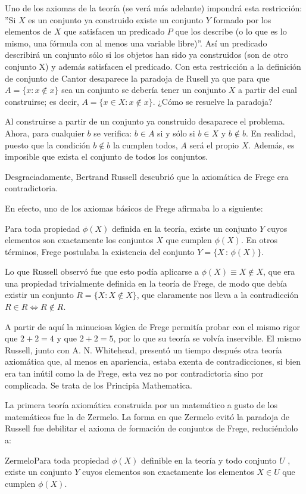 Uno de los axiomas de la teoría (se verá más adelante) impondrá esta
restricción: ”Si $X$ es un conjunto ya construido existe un conjunto
$Y$ formado por los elementos de $X$ que satisfacen un predicado
$P$ que los describe (o lo que es lo mismo, una fórmula con al menos
una variable libre)”. Así un predicado describirá un conjunto sólo
si los objetos han sido ya construidos (son de otro conjunto X) y
además satisfacen el predicado. Con esta restricción a la definición
de conjunto de Cantor desaparece la paradoja de Rusell ya que para
que $A=\{x:x\notin x\}$ sea un conjunto se debería tener un conjunto
$X$ a partir del cual construirse; es decir, $A=\{x\in X:x\notin x\}$.
¿Cómo se resuelve la paradoja? 

Al construirse a partir de un conjunto ya construido desaparece el
problema. Ahora, para cualquier $b$ se verifica: $b\in A$ si y sólo
si $b\in X$ y $b\notin b$. En realidad, puesto que la condición
$b\notin b$ la cumplen todos, $A$ será el propio $X$. Además, es
imposible que exista el conjunto de todos los conjuntos. 

Desgraciadamente, Bertrand Russell descubrió que la axiomática de
Frege era contradictoria.

En efecto, uno de los axiomas básicos de Frege afirmaba lo a siguiente: 

Para toda propiedad $\phi(X)$ definida en la teoría, existe un conjunto
$Y$ cuyos elementos son exactamente los conjuntos $X$ que cumplen
$\phi(X)$. En otros términos, Frege postulaba la existencia del conjunto
$Y=\{X\,:\,\phi(X)\}$. 

Lo que Russell observó fue que esto podía aplicarse a $\phi(X)\equiv X\notin X$,
que era una propiedad trivialmente definida en la teoría de Frege,
de modo que debía existir un conjunto $R=\{X:X\notin X\}$, que claramente
nos lleva a la contradicción $R\in R\Leftrightarrow R\notin R$. 

A partir de aquí la minuciosa lógica de Frege permitía probar con
el mismo rigor que $2+2=4$ y que $2+2=5$, por lo que su teoría se
volvía inservible. El mismo Russell, junto con A. N. Whitehead, present\'{ó}
un tiempo después otra teoría axiomática que, al menos en apariencia,
estaba exenta de contradicciones, si bien era tan inútil como la de
Frege, esta vez no por contradictoria sino por complicada. Se trata
de los Principia Mathematica. 

La primera teoría axiomática construida por un matemático a gusto
de los matemáticos fue la de Zermelo. La forma en que Zermelo evitó
la paradoja de Russell fue debilitar el axioma de formación de conjuntos
de Frege, reduciéndolo a: \begin{axioma}{Zermelo}{}Para toda propiedad
$\phi(X)$ definible en la teoría y todo conjunto $U$ , existe un
conjunto $Y$ cuyos elementos son exactamente los elementos $X\in U$
que cumplen $\phi(X).$ \end{axioma}

